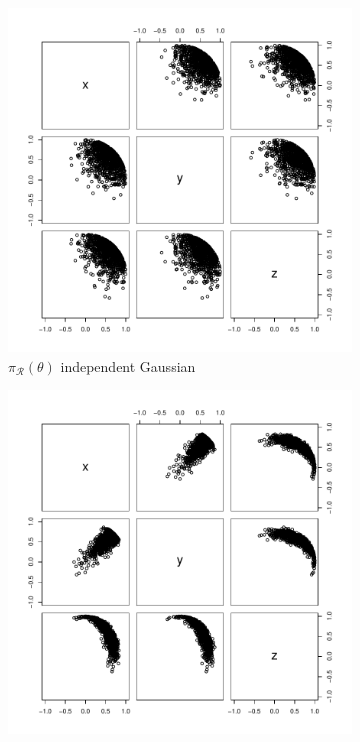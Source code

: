 \documentclass[10pt]{article}
\newcommand{\mc}[1]{\mathcal{#1}}
\DeclareMathOperator{\1}{\mathbbm{1}}
\begin{document}
\begin{figure}[H]
   \begin{subfigure}[b]{0.30\textwidth}
    \includegraphics[width=1\textwidth]{sphere_vmf}
     \caption{$\pi_{\mc R}(\theta)$ independent Gaussian}
	\end{subfigure}
    \begin{subfigure}[b]{0.30\textwidth}
     \includegraphics[width=1\textwidth]{sphere_fb}

\end{subfigure}
\end{figure}
\end{document}
